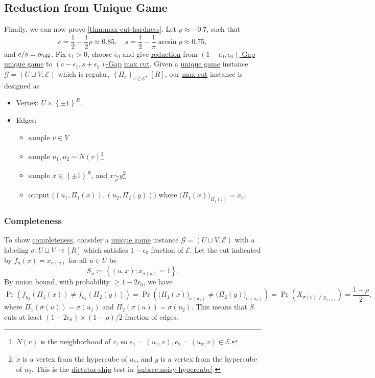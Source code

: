 \subsection{Reduction from Unique Game}
Finally, we can now prove \autoref{thm:max-cut-hardness}. Let \(\rho \approx -0.7\), such that
\[
	c = \frac{1}{2} - \frac{1}{2}\rho \approx 0.85, \quad s = \frac{1}{2} - \frac{1}{\pi }\arcsin \rho \approx 0.75,
\]
and \(c / s = \alpha _{\GW }\). Fix \(\epsilon _1 > 0\), choose \(\epsilon _0\) and give \hyperref[def:reduction]{reduction} from \hyperref[def:c-s-Gap]{\((1-\epsilon _0, \epsilon _0)\)-Gap} \hyperref[prb:unique-game]{unique game} to \hyperref[def:c-s-Gap]{\((c-\epsilon _1, s+\epsilon _1)\)-Gap} \hyperref[prb:max-cut]{max cut}. Given a \hyperref[prb:unique-game]{unique game} instance \(\mathcal{G} = (U \sqcup V , \mathcal{E} )\) which is regular, \(\left\{ \Pi _e \right\}_{e\in \mathcal{E} } \), \([R]\), our \hyperref[prb:max-cut]{max cut} instance is designed as
\begin{itemize}
	\item Vertex: \(U \times \left\{ \pm 1 \right\} ^R\).
	\item Edges:
	      \begin{itemize}
		      \item sample \(v\in V\)
		      \item sample \(u_1, u_2 \sim N(v)\)\footnote{\(N(v)\) is the neighborhood of \(v\), so \(e_1 = (u_1, v), e_2 = (u_2, v)\in \mathcal{E} \).}
		      \item sample \(x\in \left\{ \pm 1 \right\} ^R\), and \(x \underset{\rho }{\sim } y\)\footnote{\(x\) is a vertex from the hypercube of \(u_1\), and \(y\) is a vertex from the hypercube of \(u_2\). This is the \hyperref[def:dictation]{dictator-ship} test in \autoref{subsec:noisy-hypercube}.}
		      \item output \(\big( (u_1, \Pi _1(x)), (u_2, \Pi _2(y))\big)\) where \(\big(\Pi _1(x)\big)_{\Pi _1(i)} = x_i\).
	      \end{itemize}
\end{itemize}

\subsubsection{Completeness}
To show \hyperref[def:completeness]{completeness}, consider a \hyperref[prb:unique-game]{unique game} instance \(\mathcal{G} = (U \sqcup V, \mathcal{E} )\) with a labeling \(\sigma \colon U \sqcup V \to [R]\) which satisfies \(1 - \epsilon _0\) fraction of \(\mathcal{E} \). Let the cut indicated by \(f_u(x) = x_{\sigma (u)}\) for all \(u\in U\) be
\[
	S_u \coloneqq \left\{ (u, x) \colon x_{\sigma (u)} = 1 \right\}.
\]
By union bound, with probability \(\geq 1 - 2 \epsilon_0 \), we have
\[
	\Pr_{}(f_{u_1}(\Pi _1(x)) \neq f_{u_2}(\Pi _2(y)))
	= \Pr_{}(\big(\Pi _1(x)\big)_{\sigma (u_1)} \neq \big(\Pi _2(y)\big)_{\sigma (u_2)})
	= \Pr_{}(X_{\sigma (v) \neq y_{\sigma (v)}})
	= \frac{1-\rho }{2},
\]
where \(\Pi _1(\sigma (u)) = \sigma (u_1)\) and \(\Pi _2(\sigma (u)) = \sigma (u_2)\). This means that \(S\) cuts at least \((1 - 2\epsilon _0)\times (1-\rho )/2\) fraction of edges.

